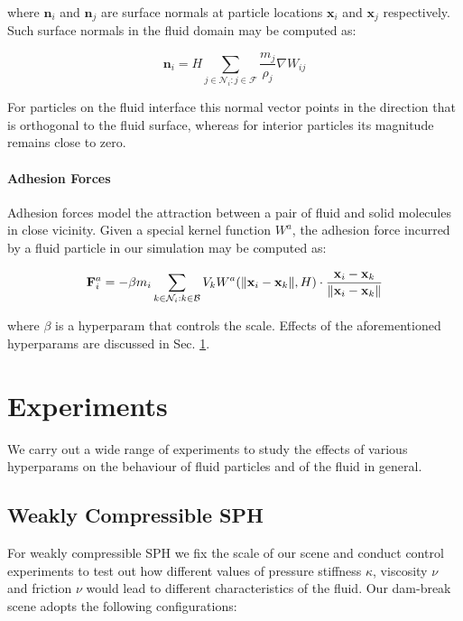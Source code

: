 \documentclass[
	11pt, 
	DIV10,
	ngerman,
	a4paper, 
	oneside, 
	headings=normal, 
	captions=tableheading,
	final, 
	numbers=noenddot
]{scrartcl}
\DeclarePairedDelimiter{\norm}{\lVert}{\rVert}
\begin{document}
where $ \mathbf{n}_{i} $ and $ \mathbf{n}_{j} $ are surface normals at particle locations $ \mathbf{x}_{i} $ and $ \mathbf{x}_{j} $ respectively. Such surface normals in the fluid domain may be computed as:

\begin{equation}
	\label{eq27}
	\mathbf{n}_{i} = H \sum_{j \in \mathcal{N}_{i}:j \in \mathcal{F}} \frac{m_{j}}{\rho_{j}} \nabla W_{ij}
\end{equation}

For particles on the fluid interface this normal vector points in the direction that is orthogonal to the fluid surface, whereas for interior particles its magnitude remains close to zero.

\paragraph{Adhesion Forces}

Adhesion forces model the attraction between a pair of fluid and solid molecules in close vicinity. Given a special kernel function $ W^{a} $, the adhesion force incurred by a fluid particle in our simulation may be computed as:

\begin{equation}
	\label{28}
	\mathbf{F}_{i}^{a} = - \beta m_{i} \sum_{k \in \mathcal{N}_{i}:k \in \mathcal{B}} V_{k} W^{a}(\norm{\mathbf{x}_{i} - \mathbf{x}_{k}}, H) \cdot \frac{\mathbf{x}_{i} - \mathbf{x}_{k}}{\norm{\mathbf{x}_{i} - \mathbf{x}_{k}}}
\end{equation}

where $ \beta $ is a hyperparam that controls the scale. Effects of the aforementioned hyperparams are discussed in Sec. \ref{sec4}.

\section{Experiments}
\label{sec4}

We carry out a wide range of experiments to study the effects of various hyperparams on the behaviour of fluid particles and of the fluid in general.

\subsection{Weakly Compressible SPH}

For weakly compressible SPH we fix the scale of our scene and conduct control experiments to test out how different values of pressure stiffness $ \kappa $, viscosity $ \nu $ and friction $ \nu$ would lead to different characteristics of the fluid. Our dam-break scene adopts the following configurations:
\end{document}
